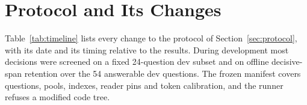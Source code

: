 \section{Protocol and Its Changes}
\label{app:timeline}

Table~\ref{tab:timeline} lists every change to the protocol of Section~\ref{sec:protocol}, with its date and its timing relative to the results. During development most decisions were screened on a fixed 24-question dev subset and on offline decisive-span retention over the 54 answerable dev questions. The frozen manifest covers questions, pools, indexes, reader pins and token calibration, and the runner refuses a modified code tree.

